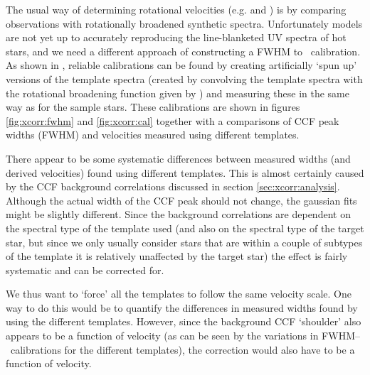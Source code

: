 The usual way of determining rotational velocities
(e.g. \cite{sl:75} and \cite{co:vii}) is by comparing observations
with rotationally broadened synthetic spectra. Unfortunately models
are not yet up to accurately reproducing the line-blanketed UV spectra of
hot stars, and we need a different approach of constructing a FWHM to
\vsini\ calibration. As shown in , reliable
calibrations can be found by creating artificially `spun up' versions
of the template spectra (created by convolving the template spectra
with the rotational broadening function given by \cite{gray}) and
measuring these in the same way as for the sample stars. These
calibrations are shown in figures \ref{fig:xcorr:fwhm} and
\ref{fig:xcorr:cal} together with a comparisons of CCF peak widths
(FWHM) and velocities measured using different templates.

There appear to be some systematic differences between measured
widths (and derived velocities) found using different templates. This
is almost certainly caused by the CCF background correlations
discussed in section \ref{sec:xcorr:analysis}. Although the actual
width of the CCF peak should not change, the gaussian fits might be
slightly different. Since the background correlations are dependent on the
spectral type of the template used (and also on the spectral type of
the target star, but since we only usually consider stars that are
within a couple of subtypes of the template it is relatively
unaffected by the target star) the effect is fairly systematic and can
be corrected for.

We thus want to `force' all the templates to follow the same velocity
scale. One way to do this would be to quantify the differences in measured widths
found by using the different templates. However, since the background
CCF `shoulder' also appears to be a function of velocity (as can be
seen by the variations in FWHM--\vsini\ calibrations for the different
templates), the correction would also have to be a function of velocity.

